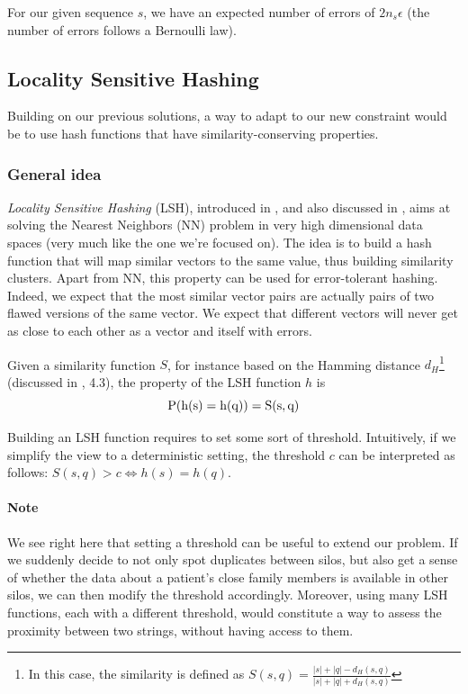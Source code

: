 \documentclass[usletter,11pt,final]{article}
\begin{document}
For our given sequence $s$, we have an expected number of errors of $2n_s\epsilon$ (the number of errors follows a Bernoulli law).

\subsection{Locality Sensitive Hashing}

Building on our previous solutions, a way to adapt to our new constraint would be to use hash functions that have similarity-conserving properties. 

\subsubsection{General idea}

\textit{Locality Sensitive Hashing} (LSH), introduced in \cite{indyk1998approximate}, and also discussed in \cite{cohen2001finding}, aims at solving the Nearest Neighbors (NN) problem in very high dimensional data spaces (very much like the one we're focused on). The idea is to build a hash function that will map similar vectors to the same value, thus building similarity clusters. Apart from NN, this property can be used for error-tolerant hashing. Indeed, we expect that the most similar vector pairs are actually pairs of two flawed versions of the same vector. We expect that different vectors will never get as close to each other as a vector and itself with errors.

Given a similarity function $S$, for instance based on the Hamming distance $d_H$\footnote{In this case, the similarity is defined as $S(s,q)= \frac{|s|+|q|-d_H(s,q)}{|s|+|q|+d_H(s,q)} $} (discussed in \cite{cohen2001finding}, 4.3), the property of the LSH function $h$ is $$ \rm P(h(s)=h(q))=S(s,q) $$

Building an LSH function requires to set some sort of threshold. Intuitively, if we simplify the view to a deterministic  setting, the threshold $c$ can be interpreted as follows: $S(s,q) > c \Leftrightarrow h(s) = h(q)$.

\paragraph{Note} We see right here that setting a threshold can be useful to extend our problem. If we suddenly decide to not only spot duplicates between silos, but also get a sense of whether the data about a patient's close family members is available in other silos, we can then modify the threshold accordingly. Moreover, using many LSH functions, each with a different threshold, would constitute a way to assess the proximity between two strings, without having access to them.
\end{document}
